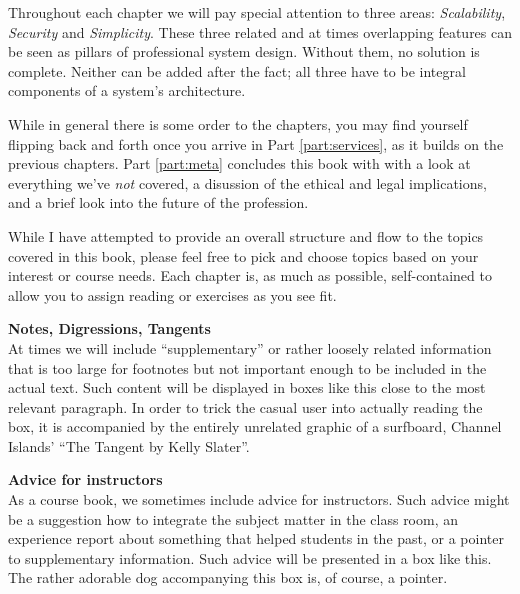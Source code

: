 Throughout each chapter we will pay special attention
to three areas: {\em Scalability}, {\em Security} and
{\em Simplicity}.  These three related and at times
overlapping features can be seen as pillars of
professional system design.  Without them, no solution
is complete.  Neither can be added after the fact; all
three have to be integral components of a system's
architecture.

While in general there is some order to the chapters,
you may find yourself flipping back and forth once you
arrive in Part \ref{part:services}, as it builds on
the previous chapters.  Part \ref{part:meta}
concludes this book with with a look at everything
we've {\em not} covered, a disussion of the ethical
and legal implications, and a brief look into the
future of the profession.

While I have attempted to provide an overall structure
and flow to the topics covered in this book, please
feel free to pick and choose topics based on your
interest or course needs.  Each chapter is, as much as
possible, self-contained to allow you to assign
reading or exercises as you see fit.

\begin{sidenote}
{\bf Notes, Digressions, Tangents} \\
At times we will include ``supplementary'' or rather loosely related
information that is too large for footnotes but not important enough to be
included in the actual text.  Such content will be displayed in boxes like
this close to the most relevant paragraph.  In order to trick the casual
user into actually reading the box, it is accompanied by the entirely
unrelated graphic of a surfboard, Channel Islands' ``The Tangent by Kelly
Slater''.
\end{sidenote}

\begin{advice}
{\bf Advice for instructors} \\
As a course book, we sometimes include advice for instructors.  Such
advice might be a suggestion how to integrate the subject
matter in the class room, an experience report about something that
helped students in the past, or a pointer to supplementary information.
Such advice will be presented in a box like this.  The rather adorable dog
accompanying this box is, of course, a pointer.
\end{advice}

